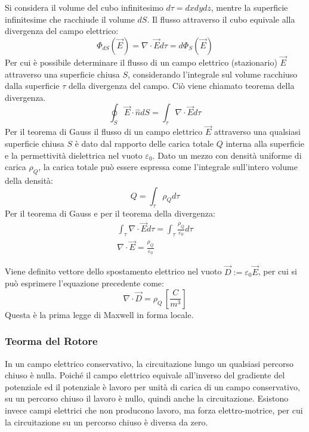 \documentclass{article}
\numberwithin{equation}{subsection}
\begin{document}
Si considera il volume del cubo infinitesimo $d\tau=dxdydz$, mentre la superficie infinitesime che racchiude il volume $dS$. Il flusso attraverso il cubo equivale alla 
divergenza del campo elettrico: 
\begin{equation*}
    \Phi_{dS}(\vec{E})={\nabla}\cdot\vec{E}d\tau=d\Phi_S(\vec{E})
\end{equation*}
Per cui è possibile determinare il flusso di un campo elettrico (stazionario) $\vec{E}$ attraverso una superficie chiusa $S$, considerando l'integrale sul volume 
racchiuso dalla superficie $\tau$ della divergenza del campo. Ciò viene chiamato teorema della divergenza. 
\begin{equation}
    \displaystyle\oint_S\vec{E}\cdot\hat{n}dS=\int_{\tau}{\nabla}\cdot\vec{E}d\tau
\end{equation} 
Per il teorema di Gauss il flusso di un campo elettrico $\vec{E}$ attraverso una qualsiasi superficie chiusa $S$ è dato dal rapporto delle carica totale $Q$ interna alla superficie 
e la permettività dielettrica nel vuoto $\varepsilon_0$. Dato un mezzo con densità uniforme di carica $\rho_Q$, la carica totale può essere espressa come l'integrale sull'intero 
volume della densità: 
\begin{equation*}
    Q=\displaystyle\int_{\tau}\rho_Qd\tau
\end{equation*}  
Per il teorema di Gauss e per il teorema della divergenza:
\begin{gather*}
    \displaystyle\int_{\tau}{\nabla}\cdot \vec{E}d\tau=\int_{\tau}\frac{\rho_Q}{\varepsilon_0}d\tau\\
    {\nabla}\cdot\vec{E}=\displaystyle\frac{\rho_Q}{\varepsilon_0}
\end{gather*}

Viene definito vettore dello spostamento elettrico nel vuoto $\vec{D}:=\varepsilon_0\vec{E}$, per cui si può esprimere l'equazione precedente come:
\begin{equation}
    {\nabla}\cdot\vec{D}=\rho_Q\,\displaystyle\left[\frac{C}{m^3}\right]
\end{equation}
Questa è la prima legge di Maxwell in forma locale. 

\subsubsection{Teorma del Rotore}

In un campo elettrico conservativo, la circuitazione lungo un qualsiasi percorso chiuso è nulla. Poiché il campo elettrico equivale all'inverso del gradiente del 
potenziale ed il potenziale è lavoro per unità di carica di un campo conservativo, su un percorso chiuso il lavoro è nullo, quindi anche la circuitazione. Esistono invece 
campi elettrici che non producono lavoro, ma forza elettro-motrice, per cui la circuitazione su un percorso chiuso è diversa da zero. 
\end{document}

